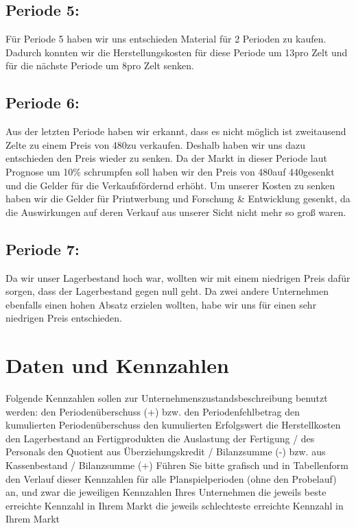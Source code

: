 \documentclass[a4paper, 12pt]{article}
\begin{document}
\begin{flushleft}
\subsection{Periode 5:}
Für Periode 5 haben wir uns entschieden Material für 2 Perioden zu kaufen.
Dadurch konnten wir die Herstellungskosten für diese Periode um 13\texteuro pro Zelt und für die nächste Periode um 8\texteuro pro Zelt senken.

\subsection{Periode 6:}
Aus der letzten Periode haben wir erkannt, dass es nicht möglich ist zweitausend Zelte zu einem Preis von 480\texteuro zu verkaufen.
Deshalb haben wir uns dazu entschieden den Preis wieder zu senken.
Da der Markt in dieser Periode laut Prognose um 10\% schrumpfen soll haben wir den Preis von 480\texteuro auf 440\texteuro gesenkt und die Gelder für die Verkaufsfördernd erhöht.
Um unserer Kosten zu senken haben wir die Gelder für Printwerbung und Forschung \& Entwicklung gesenkt, da die Auswirkungen auf deren Verkauf aus unserer Sicht nicht mehr so groß waren.


\subsection{Periode 7:}
Da wir unser Lagerbestand hoch war, wollten wir mit einem niedrigen Preis dafür sorgen,
dass der Lagerbestand gegen null geht.
Da zwei andere Unternehmen ebenfalls einen hohen Absatz erzielen wollten, habe wir uns für einen sehr niedrigen Preis entschieden.


\section{Daten und Kennzahlen}
Folgende Kennzahlen sollen zur Unternehmenszustandsbeschreibung benutzt werden:
den Periodenüberschuss (+) bzw. den Periodenfehlbetrag
den kumulierten Periodenüberschuss
den kumulierten Erfolgswert
die Herstellkosten
den Lagerbestand an Fertigprodukten
die Auslastung der Fertigung / des Personals
den Quotient aus Überziehungskredit / Bilanzsumme (-) 
bzw. aus Kassenbestand / Bilanzsumme (+)
Führen Sie bitte grafisch und in Tabellenform den Verlauf dieser Kennzahlen für alle Planspielperioden (ohne den Probelauf) an, und zwar
die jeweiligen Kennzahlen Ihres Unternehmen
die jeweils beste erreichte Kennzahl in Ihrem Markt
die jeweils schlechteste erreichte Kennzahl in Ihrem Markt




\end{flushleft}
\end{document}
